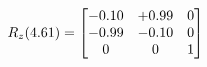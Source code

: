 \documentclass[preview]{standalone}
\begin{document}
\begin{align*}
\special{dvisvgm:raw <g id='unique000'>}R_{z}(4.61) = \begin{bmatrix}-0.10 & +0.99 & 0 \\-0.99 & -0.10 & 0 \\0 & 0 & 1\end{bmatrix}\special{dvisvgm:raw </g>}
\end{align*}
\end{document}
